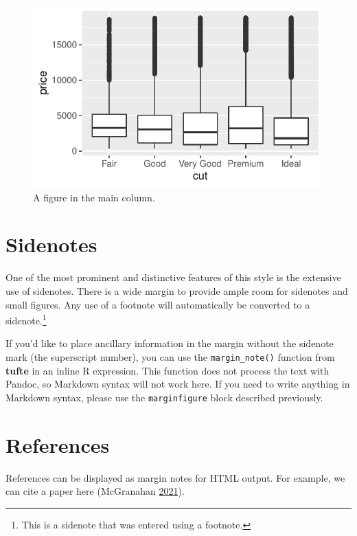 \documentclass[]{tufte-book}
\begin{document}
\begin{figure}
\includegraphics{FireScienceMethodsBook_files/figure-latex/fig-main-1} \caption[A figure in the main column]{A figure in the main column.}\label{fig:fig-main}
\end{figure}

\hypertarget{sidenotes}{%
\chapter{Sidenotes}\label{sidenotes}}

One of the most prominent and distinctive features of this style is the
extensive use of sidenotes. There is a wide margin to provide ample room
for sidenotes and small figures. Any use of a footnote will
automatically be converted to a sidenote.\footnote{This is a sidenote
  that was entered using a footnote.}

If you'd like to place ancillary information in the margin without the
sidenote mark (the superscript number), you can use the
\texttt{margin\_note()} function from \textbf{tufte} in an inline R
expression.
This function does not process the text with Pandoc, so Markdown syntax
will not work here. If you need to write anything in Markdown syntax,
please use the \texttt{marginfigure} block described previously.

\hypertarget{references-1}{%
\chapter{References}\label{references-1}}

References can be displayed as margin notes for HTML output. For
example, we can cite a paper here (McGranahan
\protect\hyperlink{ref-mcgranahan2021}{2021}).
\end{document}
